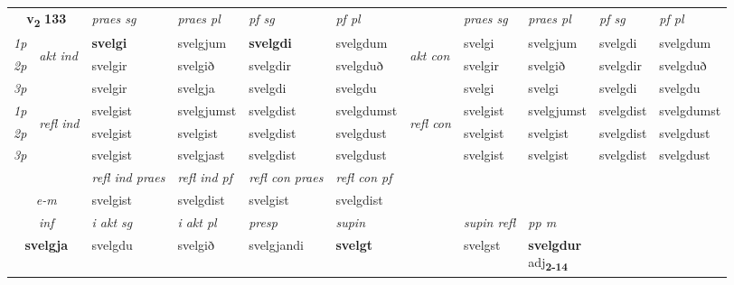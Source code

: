 \noindent
\begin{tabular}{lllllllllll} \toprule
\multicolumn{2}{c}{\textbf{v{\textsubscript{2}}} \Large{\textbf{133}}}  &  \textit{praes sg}  & \textit{praes pl}  &\textit{ pf sg} & \textit{pf pl} &  &  \textit{praes sg}  & \textit{praes pl}  & \textit{pf sg} & \textit{pf pl } \\*
	\cmidrule{3-6} \cmidrule{8-11}
 {\textit{1p}} & \multirow{3}{*}{\begin{turn}{90}\textit{akt ind}\end{turn}} & \textbf{svelgi} & svelgjum & \textbf{svelgdi} & svelgdum & \multirow{3}{*}{\begin{turn}{90}\textit{akt con}\end{turn}} &svelgi & svelgjum & svelgdi & svelgdum\\*
 {\textit{2p}} &  &  svelgir  & svelgið & svelgdir & svelgduð & & svelgir & svelgið & svelgdir & svelgduð \\*
{\textit{3p}} &  & svelgir & svelgja & svelgdi & svelgdu & & svelgi & svelgi& svelgdi & svelgdu \\*
\cmidrule{3-6} \cmidrule{8-11}
 {\textit{1p}} & \multirow{3}{*}{\begin{turn}{90}\textit{refl ind}\end{turn}}  & svelgist & svelgjumst & svelgdist & svelgdumst & \multirow{3}{*}{\begin{turn}{90}\textit{refl con}\end{turn}}  &svelgist & svelgjumst & svelgdist & svelgdumst \\*
 {\textit{2p}} &  & svelgist & svelgist & svelgdist & svelgdust & &svelgist & svelgist & svelgdist & svelgdust \\*
 {\textit{3p}}  & & svelgist & svelgjast & svelgdist & svelgdust & & svelgist & svelgist& svelgdist & svelgdust \\*
\cmidrule{3-6} \cmidrule{8-11}

 & & \textit{refl ind praes} & \textit{refl ind pf} & \textit{refl con praes} & \textit{refl con pf} \\*
 \multicolumn{2}{c}{ \textit{e-m} }& svelgist & svelgdist & svelgist & svelgdist \\*

\cmidrule{3-9}
   \multicolumn{2}{c}{\textit{inf}}  & \textit{i akt sg} & \textit{i akt pl}   & \textit{presp} & \textit{supin} && \textit{supin refl} & \textit{pp m} \\*
  \multicolumn{2}{c}{\textbf{svelgja}} & svelgdu  & svelgið   & svelgjandi &  \textbf{svelgt} && svelgst & \specialcell{\textbf{svelgdur} \\ adj\textbf{\textsubscript{2-14}}} \\*
\end{tabular}

